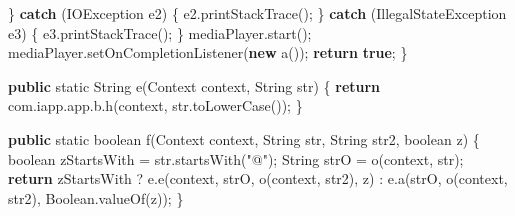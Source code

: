 \documentclass[
]{article}
\newenvironment{Shaded}{}{}
\newcommand{\BuiltInTok}[1]{\textcolor[rgb]{0.00,0.50,0.00}{#1}}
\newcommand{\ControlFlowTok}[1]{\textcolor[rgb]{0.00,0.44,0.13}{\textbf{#1}}}
\newcommand{\DataTypeTok}[1]{\textcolor[rgb]{0.56,0.13,0.00}{#1}}
\newcommand{\FunctionTok}[1]{\textcolor[rgb]{0.02,0.16,0.49}{#1}}
\newcommand{\KeywordTok}[1]{\textcolor[rgb]{0.00,0.44,0.13}{\textbf{#1}}}
\newcommand{\NormalTok}[1]{#1}
\newcommand{\OperatorTok}[1]{\textcolor[rgb]{0.40,0.40,0.40}{#1}}
\newcommand{\StringTok}[1]{\textcolor[rgb]{0.25,0.44,0.63}{#1}}
\begin{document}
\begin{Shaded}
\begin{Highlighting}[]
        \OperatorTok{\}} \ControlFlowTok{catch} \OperatorTok{(}\BuiltInTok{IOException}\NormalTok{ e2}\OperatorTok{)} \OperatorTok{\{}
\NormalTok{            e2}\OperatorTok{.}\FunctionTok{printStackTrace}\OperatorTok{();}
        \OperatorTok{\}} \ControlFlowTok{catch} \OperatorTok{(}\BuiltInTok{IllegalStateException}\NormalTok{ e3}\OperatorTok{)} \OperatorTok{\{}
\NormalTok{            e3}\OperatorTok{.}\FunctionTok{printStackTrace}\OperatorTok{();}
        \OperatorTok{\}}
\NormalTok{        mediaPlayer}\OperatorTok{.}\FunctionTok{start}\OperatorTok{();}
\NormalTok{        mediaPlayer}\OperatorTok{.}\FunctionTok{setOnCompletionListener}\OperatorTok{(}\KeywordTok{new} \FunctionTok{a}\OperatorTok{());}
        \ControlFlowTok{return} \KeywordTok{true}\OperatorTok{;}
    \OperatorTok{\}}

    \KeywordTok{public} \DataTypeTok{static} \BuiltInTok{String} \FunctionTok{e}\OperatorTok{(}\BuiltInTok{Context}\NormalTok{ context}\OperatorTok{,} \BuiltInTok{String}\NormalTok{ str}\OperatorTok{)} \OperatorTok{\{}
        \ControlFlowTok{return}\NormalTok{ com}\OperatorTok{.}\FunctionTok{iapp}\OperatorTok{.}\FunctionTok{app}\OperatorTok{.}\FunctionTok{b}\OperatorTok{.}\FunctionTok{h}\OperatorTok{(}\NormalTok{context}\OperatorTok{,}\NormalTok{ str}\OperatorTok{.}\FunctionTok{toLowerCase}\OperatorTok{());}
    \OperatorTok{\}}

    \KeywordTok{public} \DataTypeTok{static} \DataTypeTok{boolean} \FunctionTok{f}\OperatorTok{(}\BuiltInTok{Context}\NormalTok{ context}\OperatorTok{,} \BuiltInTok{String}\NormalTok{ str}\OperatorTok{,} \BuiltInTok{String}\NormalTok{ str2}\OperatorTok{,} \DataTypeTok{boolean}\NormalTok{ z}\OperatorTok{)} \OperatorTok{\{}
        \DataTypeTok{boolean}\NormalTok{ zStartsWith }\OperatorTok{=}\NormalTok{ str}\OperatorTok{.}\FunctionTok{startsWith}\OperatorTok{(}\StringTok{"@"}\OperatorTok{);}
        \BuiltInTok{String}\NormalTok{ strO }\OperatorTok{=} \FunctionTok{o}\OperatorTok{(}\NormalTok{context}\OperatorTok{,}\NormalTok{ str}\OperatorTok{);}
        \ControlFlowTok{return}\NormalTok{ zStartsWith }\OperatorTok{?}\NormalTok{ e}\OperatorTok{.}\FunctionTok{e}\OperatorTok{(}\NormalTok{context}\OperatorTok{,}\NormalTok{ strO}\OperatorTok{,} \FunctionTok{o}\OperatorTok{(}\NormalTok{context}\OperatorTok{,}\NormalTok{ str2}\OperatorTok{),}\NormalTok{ z}\OperatorTok{)} \OperatorTok{:}\NormalTok{ e}\OperatorTok{.}\FunctionTok{a}\OperatorTok{(}\NormalTok{strO}\OperatorTok{,} \FunctionTok{o}\OperatorTok{(}\NormalTok{context}\OperatorTok{,}\NormalTok{ str2}\OperatorTok{),} \BuiltInTok{Boolean}\OperatorTok{.}\FunctionTok{valueOf}\OperatorTok{(}\NormalTok{z}\OperatorTok{));}
    \OperatorTok{\}}


\end{Highlighting}
\end{Shaded}
\end{document}

